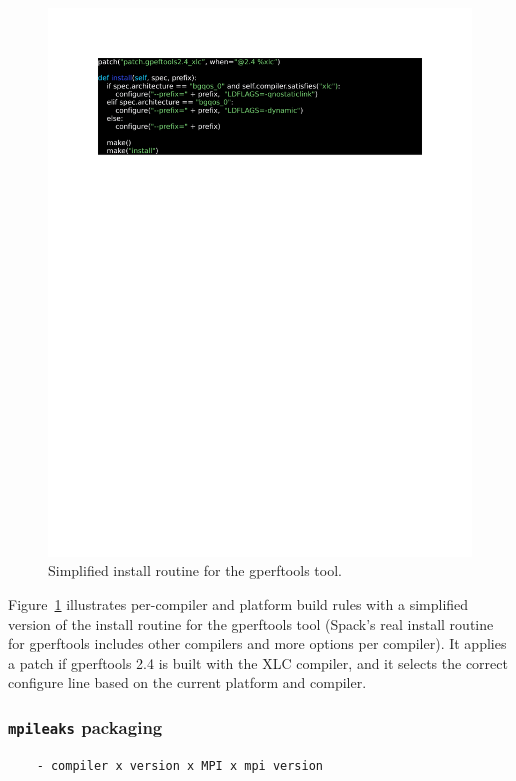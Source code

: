 \begin{figure}
  \includegraphics[width=\columnwidth]{code/gperftools.pdf}
  \caption{
    Simplified install routine for the gperftools tool.
    \label{fig:gperftools}
  }
\end{figure}

Figure~\ref{fig:gperftools} illustrates per-compiler and platform build rules with 
a simplified version of the install routine for the gperftools tool (Spack's real 
install routine for gperftools includes other compilers and more options per
compiler).  It applies a patch if gperftools 2.4 is built with the XLC compiler, 
and it selects the correct configure line based on the current platform and compiler.  

\subsubsection{{\tt mpileaks} packaging}
\begin{verbatim}
	- compiler x version x MPI x mpi version
\end{verbatim}

